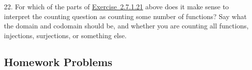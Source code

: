 \documentclass[10pt,]{book}
\theoremstyle{plain}
\theoremstyle{definition}
\theoremstyle{definition}
\theoremstyle{definition}
\numberwithin{equation}{chapter}
\begin{document}
\begin{exerciselist}
\par\smallskip
\item[22.]\hypertarget{exercise-123}{}
            For which of the parts of \hyperlink{exr_cookie-counting}{Exercise~2.7.1.21} above does it make sense to interpret the counting question as counting some number of functions? Say what the domain and codomain should be, and whether you are counting all functions, injections, surjections, or something else.
\par\smallskip
\end{exerciselist}
\typeout{************************************************}
\typeout{************************************************}
\subsection[Homework Problems]{Homework Problems}\label{exercises-11}
\end{document}
